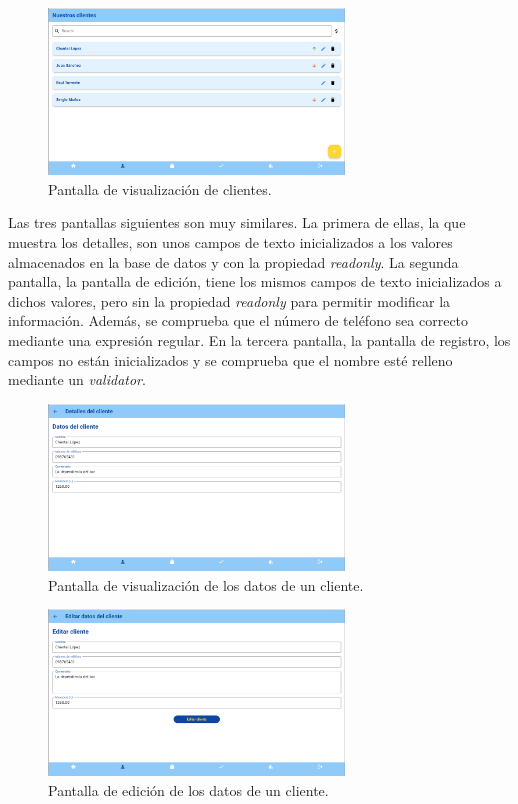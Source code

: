 \begin{figure}[H]
	\centering
	\includegraphics[width=0.7\textwidth]{imagenes/TerceraIteracion/clientView.png}
	\caption{Pantalla de visualización de clientes.}
\end{figure}

Las tres pantallas siguientes son muy similares. La primera de ellas, la que muestra los detalles, son unos campos de texto inicializados a los valores almacenados en la base de datos y con la propiedad \textit{readonly}. La segunda pantalla, la pantalla de edición, tiene los mismos campos de texto inicializados a dichos valores, pero sin la propiedad \textit{readonly} para permitir modificar la información. Además, se comprueba que el número de teléfono sea correcto mediante una expresión regular. En la tercera pantalla, la pantalla de registro, los campos no están inicializados y se comprueba que el nombre esté relleno mediante un \textit{validator}.  

\begin{figure}[H]
	\centering
	\includegraphics[width=0.7\textwidth]{imagenes/TerceraIteracion/clientDetails.png}
	\caption{Pantalla de visualización de los datos de un cliente.}
\end{figure}

\begin{figure}[H]
	\centering
	\includegraphics[width=0.7\textwidth]{imagenes/TerceraIteracion/clientEdit.png}
	\caption{Pantalla de edición de los datos de un cliente.}
\end{figure}

